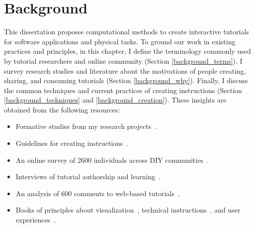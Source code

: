 
\chapter{Background}
\label{chapter_background}

This dissertation proposes computational methods to create interactive tutorials for software applications and physical tasks. To ground our work in existing practices and principles, in this chapter, I define the terminology commonly used by tutorial researchers and online community (Section \ref{background_terms}).
%
I survey research studies and literature about the motivations of people creating, sharing, and consuming tutorials (Section \ref{background_why}). Finally, I discuss the common techniques and current practices of creating instructions (Section \ref{background_techniques} and \ref{background_creation}).
%
These insights are obtained from the following resources:
\begin{itemize}
  \item Formative studies from my research projects~\cite{Chi:2012:MAG:2380116.2380130,Chi:2014:DRS:2556288.2557254,Chi:2013:DGC:2501988.2502052,Chi:2016:DemoDraw}.
  \item Guidelines for creating instructions~\cite{InstructableHowTo,wikiHowHowTo}.
  \item An online survey of 2600 individuals across DIY communities~\cite{Kuznetsov:2010:REA:1868914.1868950}.
  \item Interviews of tutorial authorship and learning~\cite{Torrey:2007he,Torrey:2009fc,Wakkary:2015:TAH:2702123.2702550,Tseng:2014:PVP:2598510.2598540}.
  \item An analysis of 600 comments to web-based tutorials~\cite{BenLafreniere:2013ux}.
  \item Books of principles about visualization~\cite{tufte1990envisioning}, technical instructions~\cite{mijksenaar1999open}, and user experiences~\cite{greenberg2012sketching,Buxton:2007:SUE:1526229}.
\end{itemize}

